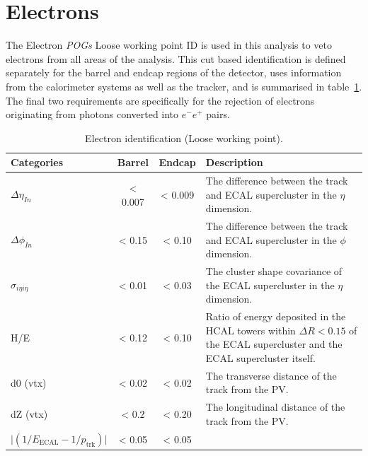 \section{Electrons}  %
\label{sec:objects_electrons}
The Electron \emph{POGs} Loose working point ID \cite{ref:electronidtwiki} is
used in this analysis to veto 
electrons from all areas of the analysis. This cut based identification is 
defined separately for the barrel and endcap regions of the detector, uses
information
from the calorimeter systems as well as the tracker, and is
summarised in table~\ref{tab:ele-id}. The final two requirements are
specifically for the rejection of electrons originating from photons converted
into $e^-e^+$ pairs.

\begin{table}[ht!]
  \caption{Electron identification (Loose working point).\label{tab:ele-id}}
  \centering
  \scriptsize
  \begin{tabular}{ lccp{8cm} }
    \hline
    \hline
    Categories                                               & Barrel    &
    Endcap    & 
    Description \\
    \hline
    $\Delta \eta_{In}$                                       & < 0.007     &
    < 0.009     & 
    The difference between the track and ECAL supercluster in the $\eta$ dimension. \\
    $\Delta \phi_{In}$                                       & < 0.15      &
    < 0.10      &
    The difference between the track and ECAL supercluster in the $\phi$ dimension. \\
    $\sigma_{i\eta i\eta}$                                   & < 0.01      &
    < 0.03      & 
    The cluster shape covariance of the ECAL supercluster in the $\eta$ dimension. \\
    H/E                                                      & < 0.12      & < 0.10      &
    Ratio of energy deposited in the HCAL towers within $\Delta R<0.15$ of the ECAL 
    supercluster and the ECAL supercluster itself. \\
    d0 (vtx)                                                 & < 0.02      & < 0.02      &
    The transverse distance of the track from the PV. \\
    dZ (vtx)                                                 & < 0.2       & < 0.20      &
    The longitudinal distance of the track from the PV. \\
    $\lvert(1/E_{\textrm{ECAL}} - 1/p_{\textrm{trk}})\rvert$ & < 0.05      & < 0.05      &

\end{tabular}
\end{table}
